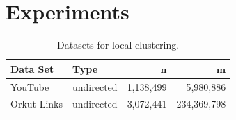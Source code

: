 \vspace{-1mm}
\section{Experiments} \label{sec:exp}

\begin{table}[t]
	\vspace{-2mm}
	\centering
	\tblcapup
	\caption{Datasets for local clustering.}
	\vspace{-4mm}
	\tblcapdown
	\begin{small}
		\begin{tabular}{|l|l|r|r|} %
			\hline
			{\bf Data Set} & {\bf Type} & {\bf $\boldsymbol{n}$} & {\bf $\boldsymbol{m}$}	 \\ \hline
			YouTube  & undirected & 1,138,499 & 5,980,886 \\
			Orkut-Links  & undirected & 3,072,441 & 234,369,798 \\		

\end{tabular}
\end{small}
\end{table}
